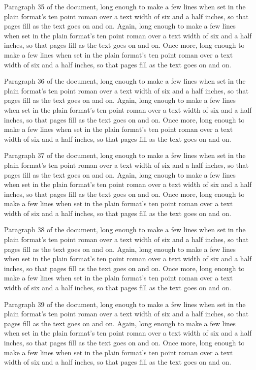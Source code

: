 Paragraph 35 of the document, long enough to make a few lines when set in the plain format's ten point roman over a text width of six and a half inches, so that pages fill as the text goes on and on. Again, long enough to make a few lines when set in the plain format's ten point roman over a text width of six and a half inches, so that pages fill as the text goes on and on. Once more, long enough to make a few lines when set in the plain format's ten point roman over a text width of six and a half inches, so that pages fill as the text goes on and on.

Paragraph 36 of the document, long enough to make a few lines when set in the plain format's ten point roman over a text width of six and a half inches, so that pages fill as the text goes on and on. Again, long enough to make a few lines when set in the plain format's ten point roman over a text width of six and a half inches, so that pages fill as the text goes on and on. Once more, long enough to make a few lines when set in the plain format's ten point roman over a text width of six and a half inches, so that pages fill as the text goes on and on.

Paragraph 37 of the document, long enough to make a few lines when set in the plain format's ten point roman over a text width of six and a half inches, so that pages fill as the text goes on and on. Again, long enough to make a few lines when set in the plain format's ten point roman over a text width of six and a half inches, so that pages fill as the text goes on and on. Once more, long enough to make a few lines when set in the plain format's ten point roman over a text width of six and a half inches, so that pages fill as the text goes on and on.

Paragraph 38 of the document, long enough to make a few lines when set in the plain format's ten point roman over a text width of six and a half inches, so that pages fill as the text goes on and on. Again, long enough to make a few lines when set in the plain format's ten point roman over a text width of six and a half inches, so that pages fill as the text goes on and on. Once more, long enough to make a few lines when set in the plain format's ten point roman over a text width of six and a half inches, so that pages fill as the text goes on and on.

Paragraph 39 of the document, long enough to make a few lines when set in the plain format's ten point roman over a text width of six and a half inches, so that pages fill as the text goes on and on. Again, long enough to make a few lines when set in the plain format's ten point roman over a text width of six and a half inches, so that pages fill as the text goes on and on. Once more, long enough to make a few lines when set in the plain format's ten point roman over a text width of six and a half inches, so that pages fill as the text goes on and on.

